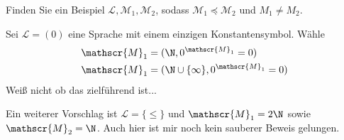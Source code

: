 
\begin{exercise}[143]
Finden Sie ein Beispiel $\mathscr{L},\mathscr{M}_1,\mathscr{M}_2$, sodass
$\mathscr{M}_1 \preccurlyeq \mathscr{M}_2$ und $M_1 \neq M_2$.
\end{exercise}


\begin{solution}
Sei $\mathscr{L} = (0)$ eine Sprache mit einem einzigen Konstantensymbol.
Wähle
\begin{align*}
  \mathscr{M}_1 &= (\N,0^{\mathscr{M}_1} = 0) \\
  \mathscr{M}_1 &= (\N \cup \{\infty\},0^{\mathscr{M}_1} = 0) \\
\end{align*}
Weiß nicht ob das zielführend ist...
\end{solution}


\begin{solution}
	Ein weiterer Vorschlag ist $\mathscr{L} = \{\leq\}$ und $\mathscr{M}_1 = 2\N$ sowie $\mathscr{M}_2 = \N$. Auch hier ist mir noch kein sauberer Beweis gelungen.
\end{solution}